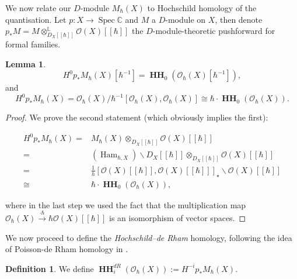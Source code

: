 \documentclass[draft]{article}
\theoremstyle{definition}
\newtheorem{lemma}[theorem]{Lemma}
\newtheorem{definition}[theorem]{Definition}
\DeclareMathOperator{\Spec}{{Spec}}
\DeclareMathOperator{\Ham}{{Ham}}
\DeclareMathOperator{\gr}{gr}
\DeclareMathOperator{\HH}{\mathbf{HH}}
\newcommand{\doubleh}{[\![ \hbar ]\!]}
\newcommand{\OhX}{\mathcal{O}_\hbar(X)}
\newcommand{\MhX}{M_\hbar(X)}
\newcommand{\OXh}{\mathcal{O}(X)\doubleh}
\begin{document}
We now relate our $D$-module $\MhX$ to Hochschild homology of the quantisation. Let $p:X\to \Spec \mathbb{C}$ and $M$ a $D$-module on $X$, then denote $p_* M=M\otimes_{D_X\doubleh}^\mathbb{L}\OXh$ the $D$-module-theoretic pushforward for formal families. 

\begin{lemma}
$$H^0p_*M_\hbar(X)[\hbar^{-1}]=\HH_0(\OhX[\hbar^{-1}]),$$ and $$H^0p_*M_\hbar(X)=\OhX/\hbar^{-1}[\OhX,\OhX]\cong\hbar\cdot \HH_0(\OhX).$$ 
\end{lemma}


\begin{proof}
We prove the second statement (which obviously implies the first):
\begin{center}
    \begin{align*}
        H^0p_*M_\hbar(X)=&M_\hbar(X)\otimes_{D_X\doubleh}\mathcal{O}(X)\doubleh\\
        =&(\Ham_{\hbar,X}) \backslash D_X\doubleh\otimes_{D_X\doubleh}\mathcal{O}(X)\doubleh\\
        =&\frac{1}{h}[\mathcal{O}(X)\doubleh,\mathcal{O}(X)\doubleh]_{\star}\backslash \mathcal{O}(X)\doubleh\\
        \cong&\hbar \cdot \HH_{0}(\OhX),
    \end{align*}
\end{center}
where in the last step  we used the fact that the multiplication map $\OhX\xrightarrow{\cdot \hbar} \hbar \OXh$ is an isomorphism of vector spaces.
\end{proof}


We now proceed to define the \textit{Hochschild--de Rham} homology, following the idea of Poisson-de Rham homology in \cite{Poisson_Traces_and_D-Modules_on_Poisson_Varieties}.

\begin{definition}
We define $\HH^{dR}_{i}(\OhX):=H^{-i}p_*M_\hbar(X)$.
\end{definition}
\end{document}
